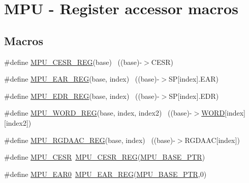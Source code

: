 \hypertarget{group___m_p_u___register___accessor___macros}{}\section{M\+PU -\/ Register accessor macros}
\label{group___m_p_u___register___accessor___macros}
\subsection*{Macros}
\begin{DoxyCompactItemize}
\item 
\#define \hyperlink{group___m_p_u___register___accessor___macros_ga384f0913132f4436b210f5471aa2bc76}{M\+P\+U\+\_\+\+C\+E\+S\+R\+\_\+\+R\+EG}(base)                                          ~((base)-\/$>$C\+E\+SR)
\item 
\#define \hyperlink{group___m_p_u___register___accessor___macros_gafde49426a0663bf8cbd3b327071d5244}{M\+P\+U\+\_\+\+E\+A\+R\+\_\+\+R\+EG}(base,  index)                                ~((base)-\/$>$SP\mbox{[}index\mbox{]}.E\+AR)
\item 
\#define \hyperlink{group___m_p_u___register___accessor___macros_gab5f1a86206f206716183f511c3530425}{M\+P\+U\+\_\+\+E\+D\+R\+\_\+\+R\+EG}(base,  index)                                ~((base)-\/$>$SP\mbox{[}index\mbox{]}.E\+DR)
\item 
\#define \hyperlink{group___m_p_u___register___accessor___macros_ga4bd0f804682db1d2e2887f98b3e45e72}{M\+P\+U\+\_\+\+W\+O\+R\+D\+\_\+\+R\+EG}(base,  index,  index2)                ~((base)-\/$>$\hyperlink{types_8h_a97d510db52424c21aa68ebf2023b2631}{W\+O\+RD}\mbox{[}index\mbox{]}\mbox{[}index2\mbox{]})
\item 
\#define \hyperlink{group___m_p_u___register___accessor___macros_ga23cb65d4881e41613a4fc75dda589b13}{M\+P\+U\+\_\+\+R\+G\+D\+A\+A\+C\+\_\+\+R\+EG}(base,  index)                          ~((base)-\/$>$R\+G\+D\+A\+AC\mbox{[}index\mbox{]})
\item 
\#define \hyperlink{group___m_p_u___register___accessor___macros_ga4acb3e496c40cc58cf9aa69ad7696550}{M\+P\+U\+\_\+\+C\+E\+SR}~\hyperlink{group___m_p_u___register___accessor___macros_ga384f0913132f4436b210f5471aa2bc76}{M\+P\+U\+\_\+\+C\+E\+S\+R\+\_\+\+R\+EG}(\hyperlink{group___m_p_u___peripheral_gae2d60f80178d84225d77e5f0214d1f1d}{M\+P\+U\+\_\+\+B\+A\+S\+E\+\_\+\+P\+TR})
\item 
\#define \hyperlink{group___m_p_u___register___accessor___macros_ga705410694c17e4cc863a6c7648337845}{M\+P\+U\+\_\+\+E\+A\+R0}~\hyperlink{group___m_p_u___register___accessor___macros_gafde49426a0663bf8cbd3b327071d5244}{M\+P\+U\+\_\+\+E\+A\+R\+\_\+\+R\+EG}(\hyperlink{group___m_p_u___peripheral_gae2d60f80178d84225d77e5f0214d1f1d}{M\+P\+U\+\_\+\+B\+A\+S\+E\+\_\+\+P\+TR},0)

\end{DoxyCompactItemize}

